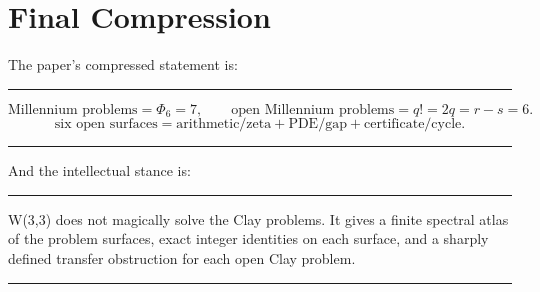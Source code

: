 \documentclass[11pt]{article}
\theoremstyle{definition}
\newenvironment{keybox}{%
  \begin{center}\begin{minipage}{0.94\linewidth}\color{darkblue}\hrule\vspace{0.65em}
}{%
  \vspace{0.65em}\hrule\end{minipage}\end{center}
}
\newenvironment{graybox}{%
  \begin{center}\begin{minipage}{0.94\linewidth}\hrule\vspace{0.65em}
}{%
  \vspace{0.65em}\hrule\end{minipage}\end{center}
}
\begin{document}
\section{Final Compression}

The paper's compressed statement is:

\begin{keybox}
\[
\boxed{
\text{Millennium problems}=\Phi_6=7,
\qquad
\text{open Millennium problems}=q!=2q=r-s=6.
}
\]
\[
\boxed{
\text{six open surfaces}=\text{arithmetic/zeta}+\text{PDE/gap}+\text{certificate/cycle}.
}
\]
\end{keybox}

And the intellectual stance is:

\begin{graybox}
W(3,3) does not magically solve the Clay problems.  It gives a finite spectral atlas of the problem surfaces, exact integer identities on each surface, and a sharply defined transfer obstruction for each open Clay problem.
\end{graybox}
\end{document}
